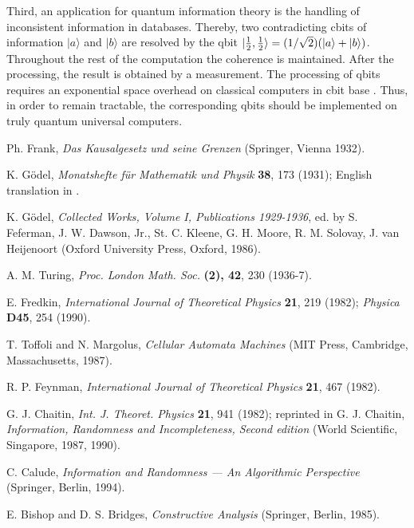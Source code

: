 Third,
an application for quantum information theory is
the handling of inconsistent information in databases.
Thereby,
two contradicting cbits of information
$\vert a\rangle $ and
$\vert b\rangle $ are resolved by the qbit
$\vert {1\over 2},{1\over 2} \rangle =
({1/ \sqrt{2}})(\vert a\rangle + \vert b\rangle )$.
Throughout the rest of the computation the coherence is maintained.
After the processing, the result is obtained by a
measurement. The processing of qbits requires an exponential space
overhead on classical computers in cbit base \cite{feynman}.
Thus, in order to remain tractable,
the corresponding qbits should be implemented on
truly quantum universal computers.



\begin{thebibliography}{99}

Ph. Frank, {\sl Das Kausalgesetz und seine Grenzen}
(Springer, Vienna 1932).

K. G\"odel, {\sl Monatshefte f\"ur Mathematik und Physik}
{\bf 38}, 173 (1931);
English translation in \cite{godel-ges1}.


 K. G\"odel, {\sl Collected Works, Volume I, Publications 1929-1936},
 ed. by S. Feferman, J. W. Dawson, Jr., St. C. Kleene, G. H. Moore, R.
 M. Solovay, J. van Heijenoort (Oxford University Press, Oxford, 1986).

 A. M. Turing, {\sl Proc. London Math. Soc.} {\bf (2), 42}, 230
 (1936-7).

 E. Fredkin, {\sl International Journal of Theoretical Physics} {\bf
21}, 219 (1982);
 {\sl Physica} {\bf D45}, 254 (1990).

 T. Toffoli and N. Margolus, {\sl Cellular Automata Machines} (MIT
 Press, Cambridge, Massachusetts, 1987).

R. P. Feynman, {\sl International Journal of Theoretical Physics}
{\bf 21}, 467 (1982).

G. J. Chaitin, {\sl Int. J. Theoret. Physics} {\bf 21}, 941 (1982);
 reprinted in
G. J. Chaitin, {\sl Information, Randomness and Incompleteness, Second
edition}
(World Scientific, Singapore, 1987, 1990).

 C. Calude,
{\sl Information and Randomness --- An Algorithmic Perspective}
(Springer, Berlin, 1994).


 E. Bishop and D. S. Bridges, {\sl Constructive Analysis} (Springer,
 Berlin, 1985).


\end{thebibliography}
